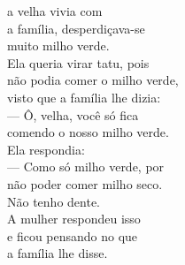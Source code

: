 

 a velha vivia com\\
a família, desperdiçava-se\\
muito milho verde.\\
Ela queria virar tatu, pois\\
não podia comer o milho verde,\\
visto que a família lhe dizia:\\
--- Ô, velha, você só fica\\
comendo o nosso milho verde.\\
Ela respondia:\\
--- Como só milho verde, por\\
não poder comer milho seco.\\
Não tenho dente.\\
A mulher respondeu isso\\
e ficou pensando no que\\
a família lhe disse.

